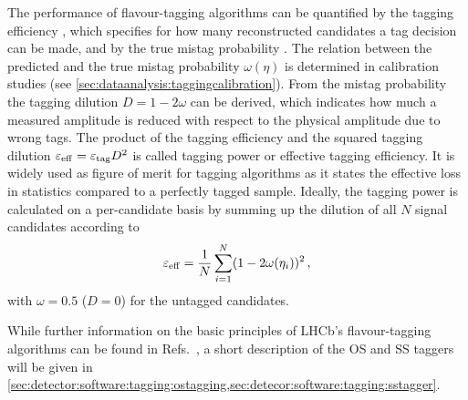 The performance of flavour-tagging algorithms can be quantified by the tagging
efficiency \etag, which specifies for how many reconstructed candidates a tag
decision can be made, and by the true mistag probability \mistag. The relation
between the predicted and the true mistag probability $\omega(\eta)$ is
determined in calibration studies (see
\cref{sec:dataanalysis:taggingcalibration}). From the mistag probability the
tagging dilution $D = 1 - 2\omega$ can be derived, which indicates how much a
measured amplitude is reduced with respect to the physical amplitude due to
wrong tags. The product of the tagging efficiency and the squared tagging
dilution $\varepsilon_{\mathrm{eff}} = {\varepsilon_{\mathrm{tag}}} D^2$ is called tagging power or effective tagging
efficiency. It is widely used as figure of merit for tagging algorithms as it
states the effective loss in statistics compared to a perfectly tagged sample.
Ideally, the tagging power is calculated on a per-candidate basis by summing
up the dilution of all $N$ signal candidates according to
\begin{equation}
	\varepsilon_{\mathrm{eff}} = \frac{1}{N}\sum_{i=1}^{N} (1 - 2\omega(\eta_i))^2\,,
\label{eq:detector:tagging:taggingpowerperevent}
\end{equation}
with $\omega = 0.5$ ($D=0$) for the untagged candidates.

While further information on the basic principles of LHCb's flavour-tagging
algorithms can be found in Refs.~\cite{LHCb-CONF-2011-003,Grabalosa:1456804},
a short description of the OS and SS taggers will be given in
\cref{sec:detector:software:tagging:ostagging,sec:detecor:software:tagging:sstagger}.



